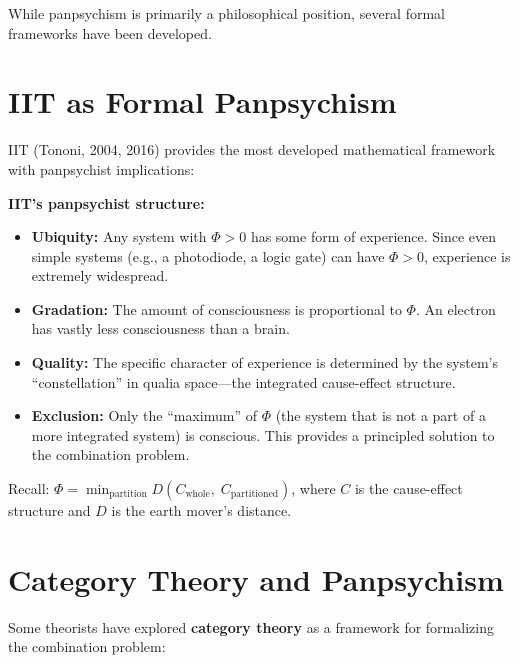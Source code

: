 \documentclass[11pt,a4paper]{report}
\begin{document}
While panpsychism is primarily a philosophical position, several formal frameworks have been developed.

\section{IIT as Formal Panpsychism}

IIT (Tononi, 2004, 2016) provides the most developed mathematical framework with panpsychist implications:

\begin{mathbox}
\vspace{-6pt}
\textbf{IIT's panpsychist structure:}
\begin{itemize}[leftmargin=1.5em]
  \item \textbf{Ubiquity:} Any system with $\Phi > 0$ has some form of experience. Since even simple systems (e.g., a photodiode, a logic gate) can have $\Phi > 0$, experience is extremely widespread.
  \item \textbf{Gradation:} The amount of consciousness is proportional to $\Phi$. An electron has vastly less consciousness than a brain.
  \item \textbf{Quality:} The specific character of experience is determined by the system's ``constellation'' in qualia space---the integrated cause-effect structure.
  \item \textbf{Exclusion:} Only the ``maximum'' of $\Phi$ (the system that is not a part of a more integrated system) is conscious. This provides a principled solution to the combination problem.
\end{itemize}
Recall: $\Phi = \min_{\text{partition}} D\!\left(C_{\text{whole}},\; C_{\text{partitioned}}\right)$, where $C$ is the cause-effect structure and $D$ is the earth mover's distance.
\vspace{-4pt}
\end{mathbox}

\section{Category Theory and Panpsychism}

Some theorists have explored \textbf{category theory} as a framework for formalizing the combination problem:
\end{document}
